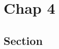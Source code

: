 \chapter{Chap 4}
\label{chap:chap4}

\lipsum[1-2]

\minitoc

\newpage

\section{Section}

\lipsum[1-2]
